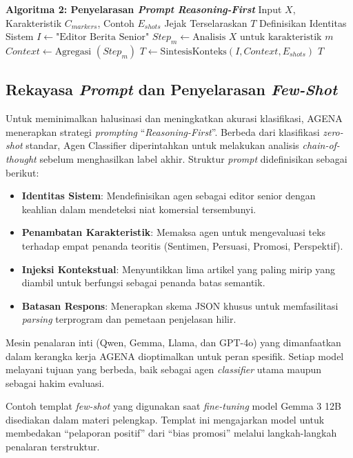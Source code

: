 \documentclass{ieeeaccess}
\begin{document}
\begin{algorithmic}
\STATE \textbf{Algoritma 2: Penyelarasan \textit{Prompt Reasoning-First}}
\REQUIRE Input $X$, Karakteristik $C_{markers}$, Contoh $E_{shots}$
\ENSURE Jejak Terselaraskan $T$
\STATE Definisikan Identitas Sistem $I \leftarrow \text{"Editor Berita Senior"}$
    \STATE $Step_m \leftarrow \text{Analisis } X \text{ untuk karakteristik } m$
\ENDFOR
\STATE $Context \leftarrow \text{Agregasi } (Step_m)$
\STATE $T \leftarrow \text{SintesisKonteks}(I, Context, E_{shots})$
\RETURN $T$
\end{algorithmic}

\subsection{Rekayasa \textit{Prompt} dan Penyelarasan \textit{Few-Shot}}
Untuk meminimalkan halusinasi dan meningkatkan akurasi klasifikasi, AGENA menerapkan strategi \textit{prompting} ``\textit{Reasoning-First}''. Berbeda dari klasifikasi \textit{zero-shot} standar, Agen Classifier diperintahkan untuk melakukan analisis \textit{chain-of-thought} sebelum menghasilkan label akhir. Struktur \textit{prompt} didefinisikan sebagai berikut:

\begin{itemize}
    \item \textbf{Identitas Sistem}: Mendefinisikan agen sebagai editor senior dengan keahlian dalam mendeteksi niat komersial tersembunyi.
    \item \textbf{Penambatan Karakteristik}: Memaksa agen untuk mengevaluasi teks terhadap empat penanda teoritis (Sentimen, Persuasi, Promosi, Perspektif).
    \item \textbf{Injeksi Kontekstual}: Menyuntikkan lima artikel yang paling mirip yang diambil untuk berfungsi sebagai penanda batas semantik.
    \item \textbf{Batasan Respons}: Menerapkan skema JSON khusus untuk memfasilitasi \textit{parsing} terprogram dan pemetaan penjelasan hilir.
\end{itemize}

Mesin penalaran inti (Qwen, Gemma, Llama, dan GPT-4o) yang dimanfaatkan dalam kerangka kerja AGENA dioptimalkan untuk peran spesifik. Setiap model melayani tujuan yang berbeda, baik sebagai agen \textit{classifier} utama maupun sebagai hakim evaluasi.

Contoh templat \textit{few-shot} yang digunakan saat \textit{fine-tuning} model Gemma 3 12B disediakan dalam materi pelengkap. Templat ini mengajarkan model untuk membedakan ``pelaporan positif'' dari ``bias promosi'' melalui langkah-langkah penalaran terstruktur.
\end{document}
